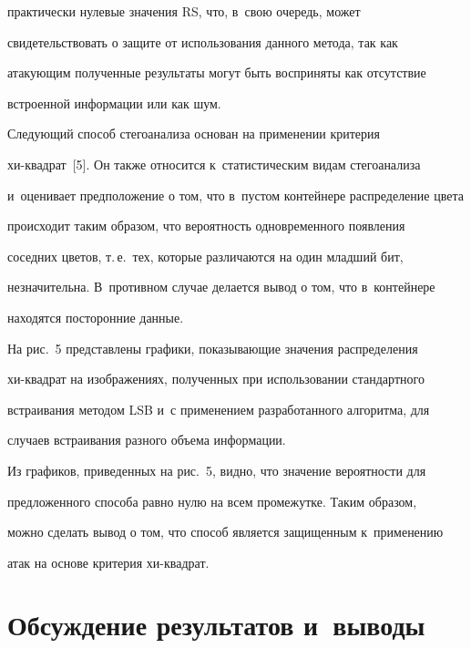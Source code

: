 практически нулевые значения RS, что, в~свою очередь, может 


свидетельствовать о защите от использования данного метода, так как 


атакующим полученные результаты могут быть восприняты как отсутствие 


встроенной информации или как шум.


  


  Следующий способ стегоанализа основан на применении критерия  


хи-квад\-рат~[5]. Он также относится к~статистическим видам стегоанализа 


и~оценивает предположение о том, что в~пустом контейнере распределение цвета 


происходит таким образом, что вероятность одновременного появления 


соседних цветов, т.\,е.\ тех, которые различаются на один младший бит, 


незначительна. В~противном случае делается вывод о том, что в~контейнере 


находятся посторонние данные. 


  


  На рис.~5 представлены графики, показывающие значения распределения  


хи-квад\-рат на изображениях, полученных при использовании стандартного 


встраивания методом LSB и~с применением разработанного алгоритма, для 


случаев встраивания разного объема информации.


  


 


  


  Из графиков, приведенных на рис.~5, видно, что значение вероятности для 


предложенного способа равно нулю на всем промежутке. Таким образом, 


можно сделать вывод о том, что способ является защищенным к~применению 


атак на основе критерия хи-квад\-рат.


  


  \section{Обсуждение результатов и~выводы}


